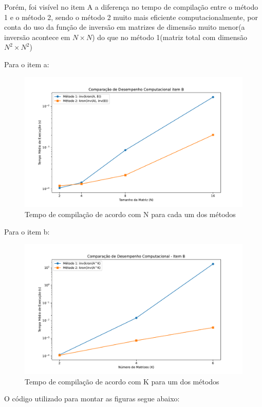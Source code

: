 \documentclass[a4paper, 12pt]{article}
\begin{document}
	Porém, foi visível no item A a diferença no tempo de compilação entre o método 1 e o método 2, sendo o método 2 muito mais eficiente computacionalmente, por conta do uso da função de inversão em matrizes de dimensão muito menor(a inversão acontece em $N \times N$) do que no método 1(matriz total com dimensão $N^2 \times N^2$)
	
	Para o item a:
	
	\begin{figure}[!h]
		\centering
		\includegraphics[width=0.9\linewidth]{itema.pdf}
		\caption{Tempo de compilação de acordo com N para cada um dos métodos}
		\label{fig:placeholder}
	\end{figure}
	
	Para o item b: 
	
	\begin{figure}[!h]
		\centering
		\includegraphics[width=0.9\linewidth]{itemb.pdf}
		\caption{Tempo de compilação de acordo com K para um dos métodos}
		\label{fig:placeholder}
	\end{figure}
	
	\newpage
	
	O código utilizado para montar as figuras segue abaixo:
	
\end{document}
